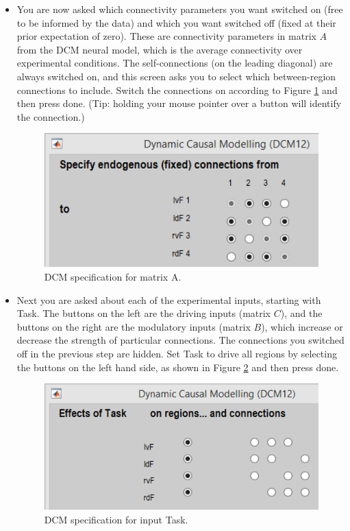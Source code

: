 \documentclass{article}
\begin{document}
\begin{itemize}
\item You are now asked which connectivity parameters you want switched on (free to be informed by the data) and which you want switched off (fixed at their prior expectation of zero). These are connectivity parameters in matrix \(A\) from the DCM neural model, which is the average connectivity over experimental conditions. The self-connections (on the leading diagonal) are always switched on, and this screen asks you to select which between-region connections to include. Switch the connections on according to Figure \ref{Fig_dcm_spec_A} and then press done. (Tip: holding your mouse pointer over a button will identify the connection.)

\begin{figure}[ht]
\begin{center}
\includegraphics{"Fig_dcm_spec_A"}
\caption{DCM specification for matrix A.\label{Fig_dcm_spec_A}}
\end{center}
\end{figure}

\item Next you are asked about each of the experimental inputs, starting with Task. The buttons on the left are the driving inputs (matrix \(C\)), and the buttons on the right are the modulatory inputs (matrix \(B\)), which increase or decrease the strength of particular connections. The connections you switched off in the previous step are hidden. Set Task to drive all regions by selecting the buttons on the left hand side, as shown in Figure \ref{Fig_dcm_spec_Task} and then press done.

\begin{figure}[ht]
\begin{center}
\includegraphics{"Fig_dcm_spec_Task"}
\caption{DCM specification for input Task.\label{Fig_dcm_spec_Task}}
\end{center}
\end{figure}


\end{itemize}
\end{document}
